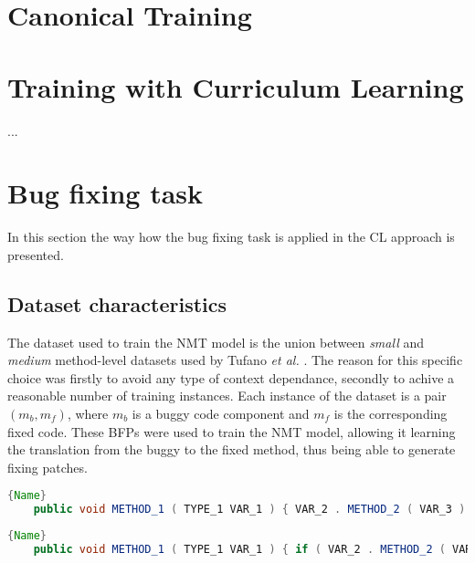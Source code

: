 \section{Canonical Training}



\section{Training with Curriculum Learning}

...

\section{Bug fixing task}
In this section the way how the bug fixing task is applied in the CL approach is presented.

\subsection{Dataset characteristics}
The dataset used to train the NMT model is the union between \textit{small} and \textit{medium} method-level datasets
used by Tufano \textit{et al.} \cite{Tufano2019}. The reason for this specific choice was firstly
to avoid any type of context dependance, secondly to achive a reasonable number of training instances.
Each instance of the dataset is a pair $(m_b, m_f)$, where $m_b$ is a buggy code component and $m_f$ is the
corresponding fixed code. These BFPs were used to train the NMT model, allowing it learning the translation
from the buggy to the fixed method, thus being able to generate fixing patches.

\begin{lstlisting}[language=Java, caption={Buggy code},label={lst:buggy1}, mathescape=true, breaklines=true]{Name}   
    public void METHOD_1 ( TYPE_1 VAR_1 ) { VAR_2 . METHOD_2 ( VAR_3 ) ; ( VAR_4 ) ++ ; METHOD_3 ( ) ; } 
\end{lstlisting}


\begin{lstlisting}[language=Java, caption={Fixed code},label={lst:fixed1}, mathescape=true, breaklines=true]{Name}
    public void METHOD_1 ( TYPE_1 VAR_1 ) { if ( VAR_2 . METHOD_2 ( VAR_3 ) ) { ( VAR_4 ) ++ ; METHOD_3 ( ) ; } }
\end{lstlisting}


